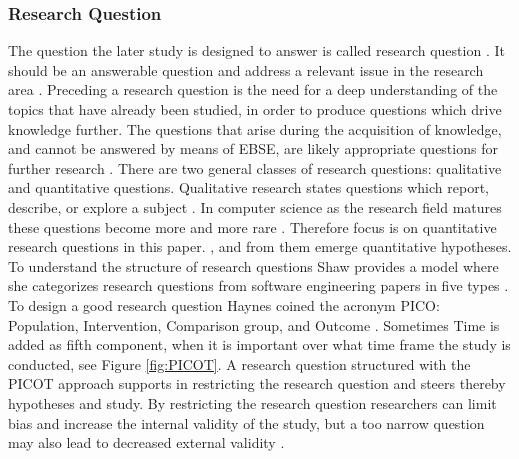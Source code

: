 
\subsubsection{Research Question}

The question the later study is designed to answer is called research question \cite{Vickers}. It should be an answerable question and address a relevant issue in the research area \cite{Dyba2005}. Preceding a research question is the need for a deep understanding of the topics that have already been studied, in order to produce questions which drive knowledge further. The questions that arise during the acquisition of knowledge, and cannot be answered by means of EBSE, are likely appropriate questions for further research \cite{Farrugia2009}. \newline
There are two general classes of research questions: qualitative and quantitative questions. Qualitative research states questions which report, describe, or explore a subject \cite[p. 139-141]{Creswell2014}. In computer science as the research field matures these questions become more and more rare . Therefore focus is on quantitative research questions in this paper.  \cite[p. 143]{Creswell2014}, and from them emerge quantitative hypotheses. \newline
To understand the structure of research questions Shaw provides a model where she categorizes research questions from software engineering papers in five types \cite{Shaw2002} . \newline
To design a good research question Haynes coined the acronym PICO: Population, Intervention, Comparison group, and Outcome \cite{BrianHaynes2006}. Sometimes Time is added as fifth component, when it is important over what time frame the study is conducted, see Figure \ref{fig:PICOT}. A research question structured with the PICOT approach supports in restricting the research question and steers thereby hypotheses and study. By restricting the research question researchers can limit bias and increase the internal validity of the study, but a too narrow question may also lead to decreased external validity \cite{Farrugia2009}. \\
